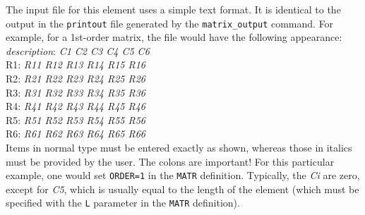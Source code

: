 The input file for this element uses a simple text format.  It is identical
to the output in the {\tt printout} file generated by the {\tt matrix\_output}
command.  For example, for a 1st-order matrix, the file would have the
following appearance:\\
{\em description}: {\em C1 C2 C3 C4 C5 C6}\\
R1: {\em R11 R12 R13 R14 R15 R16}\\
R2: {\em R21 R22 R23 R24 R25 R26}\\
R3: {\em R31 R32 R33 R34 R35 R36}\\
R4: {\em R41 R42 R43 R44 R45 R46}\\
R5: {\em R51 R52 R53 R54 R55 R56}\\
R6: {\em R61 R62 R63 R64 R65 R66}\\

Items in normal type must be entered exactly as shown, whereas those in
italics must be provided by the user.  The colons are important!
For this particular example, one would set {\tt ORDER=1} in the {\tt MATR}
definition.  Typically, the {\em Ci} are zero, except for {\em C5}, which
is usually equal to the length of the element (which must be specified with
the {\tt L} parameter in the {\tt MATR} definition).